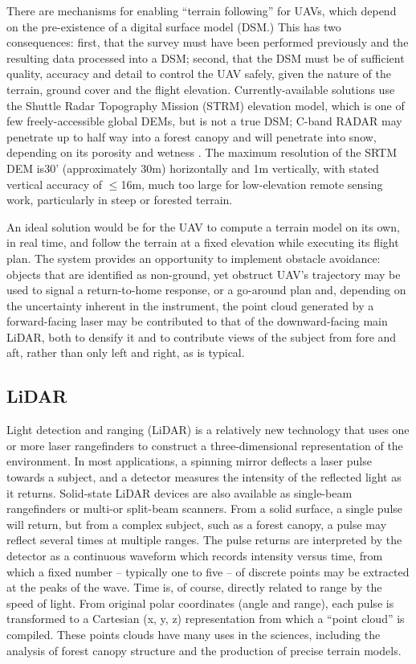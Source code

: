 \documentclass[10pt,a4paper]{report}
\begin{document}
There are mechanisms for enabling “terrain following” for UAVs, which depend on the pre-existence of a digital surface model (DSM.) This has two consequences: first, that the survey must have been performed previously and the resulting data processed into a DSM; second, that the DSM must be of sufficient quality, accuracy and detail to control the UAV safely, given the nature of the terrain, ground cover and the flight elevation. Currently-available solutions use the Shuttle Radar Topography Mission (STRM) elevation model, which is one of few freely-accessible global DEMs, but is not a true DSM; C-band RADAR may penetrate up to half way into a forest canopy \cite{Carabajal2005} and will penetrate into snow, depending on its porosity and wetness \cite{Tighe2009}. The maximum resolution of the SRTM DEM is30' (approximately 30m) horizontally and 1m vertically, with stated vertical accuracy of $\leq$16m, much too large for low-elevation remote sensing work, particularly in steep or forested terrain.  

An ideal solution would be for the UAV to compute a terrain model on its own, in real time, and follow the terrain at a fixed elevation while executing its flight plan. The system provides an opportunity to implement obstacle avoidance: objects that are identified as non-ground, yet obstruct UAV’s trajectory may be used to signal a return-to-home response, or a go-around plan and, depending on the uncertainty inherent in the instrument, the point cloud generated by a forward-facing laser may be contributed to that of the downward-facing main LiDAR, both to densify it and to contribute views of the subject from fore and aft, rather than only left and right, as is typical. 

\subsection{LiDAR}

Light detection and ranging (LiDAR) is a relatively new technology that uses one or more laser rangefinders to construct a three-dimensional representation of the environment. In most applications, a spinning mirror deflects a laser pulse towards a subject, and a detector measures the intensity of the reflected light as it returns. Solid-state LiDAR devices are also available as single-beam rangefinders or multi-or split-beam scanners. From a solid surface, a single pulse will return, but from a complex subject, such as a forest canopy, a pulse may reflect several times at multiple ranges. The pulse returns are interpreted by the detector as a continuous waveform which records intensity versus time, from which a fixed number -- typically one to five -- of discrete points may be extracted at the peaks of the wave. Time is, of course, directly related to range by the speed of light. From original polar coordinates (angle and range), each pulse is transformed to a Cartesian (x, y, z) representation from which a “point cloud” is compiled. These points clouds have many uses in the sciences, including the analysis of forest canopy structure and the production of precise terrain models. 
\end{document}
